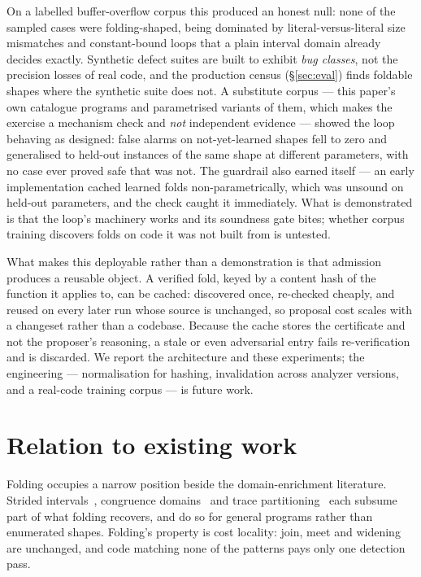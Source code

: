 \documentclass[11pt,a4paper]{article}
\begin{document}
On a labelled buffer-overflow corpus this produced an honest null: none of the sampled
cases were folding-shaped, being dominated by literal-versus-literal size mismatches and
constant-bound loops that a plain interval domain already decides exactly. Synthetic
defect suites are built to exhibit \emph{bug classes}, not the precision losses of real
code, and the production census (\S\ref{sec:eval}) finds foldable shapes where the
synthetic suite does not. A substitute corpus --- this paper's own catalogue programs and parametrised variants of
them, which makes the exercise a mechanism check and \emph{not} independent evidence ---
showed the loop behaving as designed: false alarms on not-yet-learned shapes fell to zero
and generalised to held-out instances of the same shape at different parameters, with no
case ever proved safe that was not. The guardrail also earned itself --- an early
implementation cached learned folds non-parametrically, which was unsound on held-out
parameters, and the check caught it immediately. What is demonstrated is that the loop's
machinery works and its soundness gate bites; whether corpus training discovers folds on
code it was not built from is untested.

What makes this deployable rather than a demonstration is that admission produces a
reusable object. A verified fold, keyed by a content hash of the function it applies to,
can be cached: discovered once, re-checked cheaply, and reused on every later run whose
source is unchanged, so proposal cost scales with a changeset rather than a codebase.
Because the cache stores the certificate and not the proposer's reasoning, a stale or
even adversarial entry fails re-verification and is discarded. We report the architecture
and these experiments; the engineering --- normalisation for hashing, invalidation across
analyzer versions, and a real-code training corpus --- is future work.

\section{Relation to existing work}

Folding occupies a narrow position beside the domain-enrichment literature. Strided
intervals~\cite{balakrishnan2010}, congruence domains~\cite{granger1989} and trace
partitioning~\cite{rival2007} each subsume part of what folding recovers, and do so for
general programs rather than enumerated shapes. Folding's property is cost locality:
join, meet and widening are unchanged, and code matching none of the patterns pays only
one detection pass.
\end{document}
